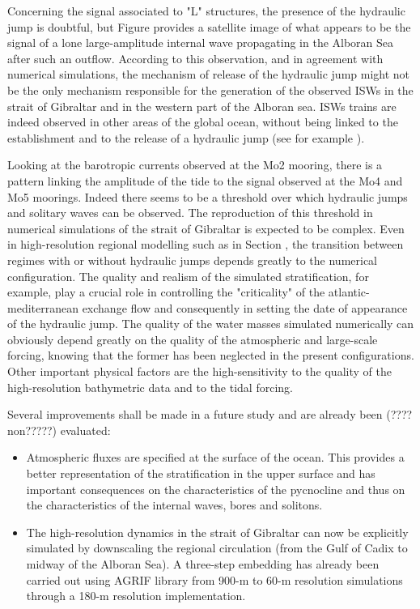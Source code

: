Concerning the signal associated to "L" structures, the presence of the hydraulic jump is doubtful, but Figure  provides a satellite image of what appears to be the signal of a lone large-amplitude internal wave propagating in the Alboran Sea after such an outflow. According to this observation, and in agreement with numerical simulations, the mechanism of release of the hydraulic jump might not be the only mechanism responsible for the generation of the observed ISWs in the strait of Gibraltar and in the western part of the Alboran sea. ISWs trains are indeed observed in other areas of the global ocean, without being linked to the establishment and to the release of a hydraulic jump (see for example \citet{chen_2017}).

Looking at the barotropic currents observed at the Mo2 mooring, there is a pattern linking the amplitude of the tide to the signal observed at the Mo4 and Mo5 moorings. Indeed there seems to be a threshold over which hydraulic jumps and solitary waves can be observed. The reproduction of this threshold in numerical simulations of the strait of Gibraltar is expected to be complex. Even in high-resolution regional modelling such as in Section , the transition between regimes with or without hydraulic jumps depends greatly to the numerical configuration. The quality and realism of the simulated stratification, for example, play a crucial role in controlling the "criticality" of the atlantic-mediterranean exchange flow and consequently in setting the date of appearance of the hydraulic jump. The quality of the water masses simulated numerically can obviously depend greatly on the quality of the atmospheric and large-scale forcing, knowing that the former has been neglected in the present configurations. Other important physical factors are the high-sensitivity to the quality of the high-resolution bathymetric data and to the tidal forcing.

Several improvements shall be made in a future study and \color{red}are already been (????non?????)\color{black} evaluated: 
\begin{itemize}
\item Atmospheric fluxes are specified at the surface of the ocean.  This provides a better representation of the stratification in the upper surface and has important consequences on the characteristics of the pycnocline and thus on the characteristics of the internal waves, bores and solitons.
\item The high-resolution dynamics in the strait of Gibraltar can now be explicitly simulated by downscaling the regional circulation (from the Gulf of Cadix to midway of the Alboran Sea). A three-step embedding has already been carried out using AGRIF library from 900-m to 60-m resolution simulations through a 180-m resolution implementation.
\end{itemize}
 
